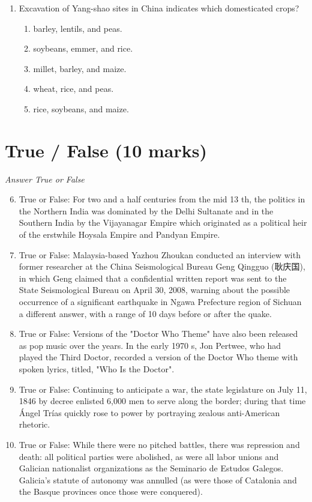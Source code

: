 \documentclass[12pt]{article}
\begin{document}
\begin{enumerate}[label=\arabic*.]
\begin{enumerate}[label=(\alph*)]
    \item Europe
    \item Africa
    \item Central America
    \item Asia
    \item None of the above
\end{enumerate}
\item Excavation of Yang-shao sites in China indicates which domesticated crops?
\begin{enumerate}[label=(\alph*)]
    \item barley, lentils, and peas.
    \item soybeans, emmer, and rice.
    \item millet, barley, and maize.
    \item wheat, rice, and peas.
    \item rice, soybeans, and maize.
\end{enumerate}
\end{enumerate}

\section*{True / False (10 marks)}
\textit{Answer True or False}
\begin{enumerate}[label=\arabic*.]
\setcounter{enumi}{5}
\item True or False: For two and a half centuries from the mid 13 th, the politics in the Northern India was dominated by the Delhi Sultanate and in the Southern India by the Vijayanagar Empire which originated as a political heir of the erstwhile Hoysala Empire and Pandyan Empire.
\item True or False: Malaysia-based Yazhou Zhoukan conducted an interview with former researcher at the China Seismological Bureau Geng Qingguo (耿庆国), in which Geng claimed that a confidential written report was sent to the State Seismological Bureau on April 30, 2008, warning about the possible occurrence of a significant earthquake in Ngawa Prefecture region of Sichuan a different answer, with a range of 10 days before or after the quake.
\item True or False: Versions of the "Doctor Who Theme" have also been released as pop music over the years. In the early 1970 s, Jon Pertwee, who had played the Third Doctor, recorded a version of the Doctor Who theme with spoken lyrics, titled, "Who Is the Doctor".
\item True or False: Continuing to anticipate a war, the state legislature on July 11, 1846 by decree enlisted 6,000 men to serve along the border; during that time Ángel Trías quickly rose to power by portraying zealous anti-American rhetoric.
\item True or False: While there were no pitched battles, there was repression and death: all political parties were abolished, as were all labor unions and Galician nationalist organizations as the Seminario de Estudos Galegos. Galicia's statute of autonomy was annulled (as were those of Catalonia and the Basque provinces once those were conquered).
\end{enumerate}
\end{document}
